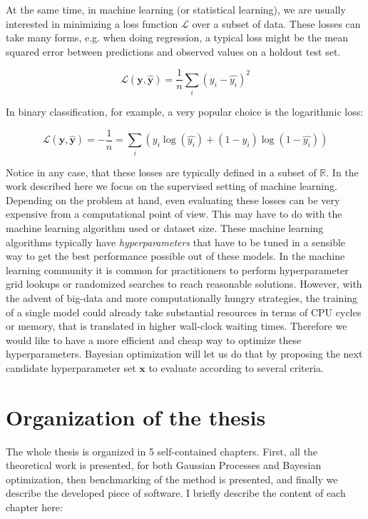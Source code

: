 \documentclass[10pt,a4paper,twoside]{book}
\begin{document}
At the same time, in machine learning (or statistical learning), we are usually interested in minimizing a loss function $\mathcal{L}$ over a subset of data. These losses can take many forms, e.g. when doing regression, a typical loss might be the mean squared error between predictions and observed values on a holdout test set.

\begin{equation}
\mathcal{L}(\boldsymbol{y}, \boldsymbol{\hat{y}}) = \dfrac{1}{n} \sum_i \left(y_i - \hat{y_i}\right)^2
\end{equation}

In binary classification, for example, a very popular choice is the logarithmic loss:

\begin{equation}
\mathcal{L}(\boldsymbol{y}, \boldsymbol{\hat{y}}) = -\dfrac{1}{n} = \sum_i \left(y_i \log(\hat{y_i}) + (1 - y_i)\log(1-\hat{y_i})\right)
\end{equation}

Notice in any case, that these losses are typically defined in a subset of $\mathbb{R}$. In the work described here we focus on the supervised setting of machine learning. Depending on the problem at hand, even evaluating these losses can be very expensive from a computational point of view. This may have to do with the machine learning algorithm used or dataset size. These machine learning algorithms typically have \textit{hyperparameters} that have to be tuned in a sensible way to get the best performance possible out of these models. In the machine learning community it is common for practitioners to perform hyperparameter grid lookups or randomized searches to reach reasonable solutions. However, with the advent of big-data and more computationally hungry strategies, the training of a single model could already take substantial resources in terms of CPU cycles or memory, that is translated in higher wall-clock waiting times. Therefore we would like to have a more efficient and cheap way to optimize these hyperparameters. Bayesian optimization will let us do that by proposing the next candidate hyperparameter set $\boldsymbol{x}$ to evaluate according to several criteria.

\section{Organization of the thesis}

The whole thesis is organized in 5 self-contained chapters. First, all the theoretical work is presented, for both Gaussian Processes and Bayesian optimization, then benchmarking of the method is presented, and finally we describe the developed piece of software. I briefly describe the content of each chapter here: \\
\end{document}
